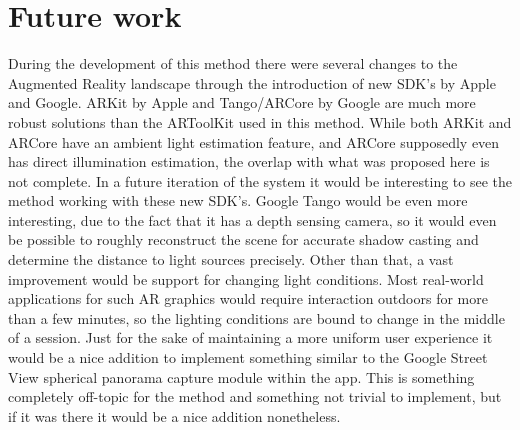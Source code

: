 \section{Future work}
During the development of this method there were several changes to the Augmented Reality landscape through the introduction of new SDK's by Apple and Google. ARKit by Apple and Tango/ARCore by Google are much more robust solutions than the ARToolKit used in this method. While both ARKit and ARCore have an ambient light estimation feature, and ARCore supposedly even has direct illumination estimation, the overlap with what was proposed here is not complete. In a future iteration of the system it would be interesting to see the method working with these new SDK's. Google Tango would be even more interesting, due to the fact that it has a depth sensing camera, so it would even be possible to roughly reconstruct the scene for accurate shadow casting and determine the distance to light sources precisely.\newline
Other than that, a vast improvement would be support for changing light conditions. Most real-world applications for such AR graphics would require interaction outdoors for more than a few minutes, so the lighting conditions are bound to change in the middle of a session.\newline
Just for the sake of maintaining a more uniform user experience it would be a nice addition to implement something similar to the Google Street View spherical panorama capture module within the app. This is something completely off-topic for the method and something not trivial to implement, but if it was there it would be a nice addition nonetheless. 